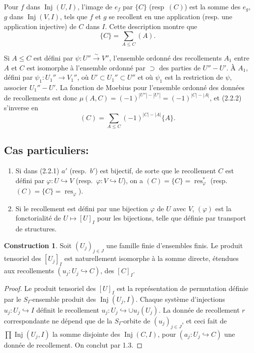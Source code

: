 \documentclass[11pt,a4paper]{article}
\theoremstyle{plain}
\theoremstyle{definition}
\newtheorem{construction}[theorem]{Construction}
\DeclareMathOperator{\Inj}{Inj}
\DeclareMathOperator{\res}{res}
\newcommand{\isom}{\xrightarrow{\sim}}
\newcommand{\inj}{\hookrightarrow}
\begin{document}
Pour $f$ dans $\Inj(U, I)$, l'image de $e_f$ par $\{C\}$ (resp~$(C)$) est la somme des $e_g$, $g$ dans $\Inj(V, I)$, tels que $f$ et $g$ se recollent en une application (resp. une application injective) de $C$ dans $I$. Cette description montre que
\begin{equation}
\{C\} = \sum_{A \leq C} (A). \tag{2.2.2}
\end{equation}

Si $A \leq C$ est d\'efini par $\psi : U'' \isom V''$, l'ensemble ordonn\'e des recollements $A_1$ entre $A$ et $C$ est isomorphe \`a l'ensemble ordonn\'e par $\supset$ des parties de $U'' - U'$. \`A $A_1$, d\'efini par $\psi_1 : U_1'' \to V_1''$, o\`u $U' \subset U_1'' \subset U''$ et o\`u $\psi_1$ est la restriction de $\psi$, associer $U_1'' - U'$. La fonction de Moebius pour l'ensemble ordonn\'e des donn\'ees de recollements est donc $\mu(A,C) = (-1)^{|U''| - |U'|} = (-1)^{|C| - |A|}$, et (2.2.2) s'inverse en
\begin{equation}
(C) = \sum_{A \leq C} (-1)^{|C| - |A|} \{A\}. \tag{2.2.3}
\end{equation}

\subsection{Cas particuliers:}

\begin{enumerate}[label=(\roman*)]
\item Si dans (2.2.1) $a'$ (resp.~$b'$) est bijectif, de sorte que le recollement $C$ est d\'efini par $\varphi : U \inj V$ (resp.~$\varphi : V \inj U$), on a $(C) = \{C\} = \res^*_\varphi$ (resp.~$(C) = \{C\} = \res_\varphi$).
\item Si le recollement est d\'efini par une bijection $\varphi$ de $U$ avec $V$, $(\varphi)$ est la fonctorialit\'e de $U \mapsto [U]_I$ pour les bijections, telle que d\'efinie par transport de structures.
\end{enumerate}

\begin{construction}
Soit $(U_j)_{j \in J}$ une famille finie d'ensembles finis. Le produit tensoriel des $[U_j]_I$ est naturellement isomorphe \`a la somme directe, \'etendues aux recollements $(u_j : U_j \inj C)$, des $[C]_I$.
\end{construction}

\begin{proof}
Le produit tensoriel des $[U]_I$ est la repr\'esentation de permutation d\'efinie par le $S_I$-ensemble produit des $\Inj(U_j, I)$. Chaque syst\`eme d'injections $u_j : U_j \inj I$ d\'efinit le recollement $u_j : U_j \inj \cup u_j(U_j)$. La donn\'ee de recollement $r$ correspondante ne d\'epend que de la $S_I$-orbite de $(u_j)_{j \in J}$, et ceci fait de $\prod \Inj(U_j, I)$ la somme disjointe des $\Inj(C, I)$, pour $(a_j : U_j \inj C)$ une donn\'ee de recollement. On conclut par 1.3.
\end{proof}
\end{document}
